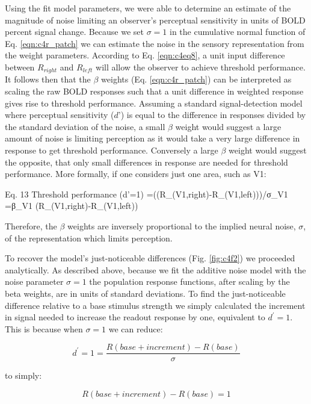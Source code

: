 \documentclass{report}
\begin{document}
Using the fit model parameters, we were able to determine an estimate of the magnitude of noise limiting an observer’s perceptual sensitivity in units of BOLD percent signal change. Because we set $\sigma=1$ in the cumulative normal function of Eq. \ref{eqn:c4r_patch} we can estimate the noise in the sensory representation from the weight parameters. According to Eq. \ref{eqn:c4eq8}, a unit input difference between $R_{right}$ and $R_{left}$ will allow the observer to achieve threshold performance. It follows then that the $\beta$ weights (Eq. \ref{eqn:c4r_patch}) can be interpreted as scaling the raw BOLD responses such that a unit difference in weighted response gives rise to threshold performance. Assuming a standard signal-detection model where perceptual sensitivity ($d’$) is equal to the difference in responses divided by the standard deviation of the noise, a small $\beta$ weight would suggest a large amount of noise is limiting perception as it would take a very large difference in response to get threshold performance. Conversely a large $\beta$ weight would suggest the opposite, that only small differences in response are needed for threshold performance. More formally, if one considers just one area, such as V1: 

Eq. 13 		Threshold performance (d'=1)  =((R_(V1,right)-R_(V1,left)))/σ_V1 =β_V1 (R_(V1,right)-R_(V1,left))

Therefore, the $\beta$ weights are inversely proportional to the implied neural noise, $\sigma$, of the representation which limits perception.

To recover the model's just-noticeable differences (Fig. \ref{fig:c4f2}) we proceeded analytically. As described above, because we fit the additive noise model with the noise parameter $\sigma=1$ the population response functions, after scaling by the beta weights, are in units of standard deviations. To find the just-noticeable difference relative to a base stimulus strength we simply calculated the increment in signal needed to increase the readout response by one, equivalent to $d^'=1$. This is because when $\sigma=1$ we can reduce:

\begin{equation}
    d^'=1=\frac{R(base+increment)-R(base)}{\sigma}
\end{equation}

to simply:
 
\begin{equation}
    R(base+increment)-R(base)=1
\end{equation}
\end{document}

